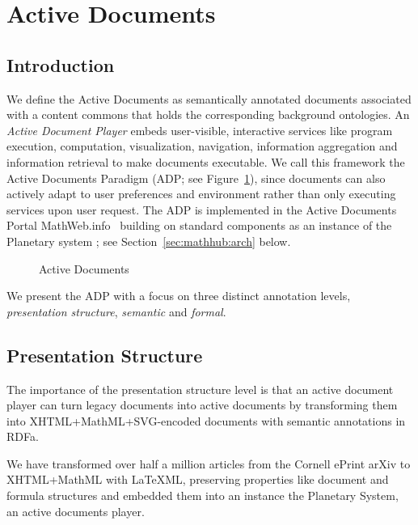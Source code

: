 \section{Active Documents}\label{sec:active}
\def\mathhub{MathHub.info\xspace}
\def\mmt{MMT\xspace}
\def\ommt{OMDoc/MMT\xspace}
\def\imgdir#1{#1}
\subsection{Introduction}

We define the Active Documents as semantically annotated documents associated with a
content commons that holds the corresponding background ontologies. An \textit{Active
  Document Player} embeds user-visible, interactive services like program execution,
computation, visualization, navigation, information aggregation and information retrieval
to make documents executable. We call this framework the Active Documents Paradigm (ADP;
see Figure~\ref{fig:activedocs}), since documents can also actively adapt to user
preferences and environment rather than only executing services upon user request. The ADP
is implemented in the Active Documents Portal MathWeb.info~\cite{MathHub:on} building on
standard components as an instance of the Planetary system \cite{Kohlhase:ppte12}; see
Section~\ref{sec:mathhub:arch} below.

\begin{figure}[ht]\centering
  
  \caption{Active Documents}\label{fig:activedocs} 
\end{figure} 

We present the ADP with a focus on three distinct annotation levels, \textit{presentation
structure}, \textit{semantic} and \textit{formal}.

\subsection{Presentation Structure}

The importance of the presentation structure level is that an active document player can
turn legacy documents into active documents by transforming them into
XHTML+MathML+SVG-encoded documents with semantic annotations in RDFa.

We have transformed over half a million articles from the Cornell ePrint arXiv to
XHTML+MathML with LaTeXML, preserving properties like document and formula structures and
embedded them into an instance the Planetary System, an active documents player.

